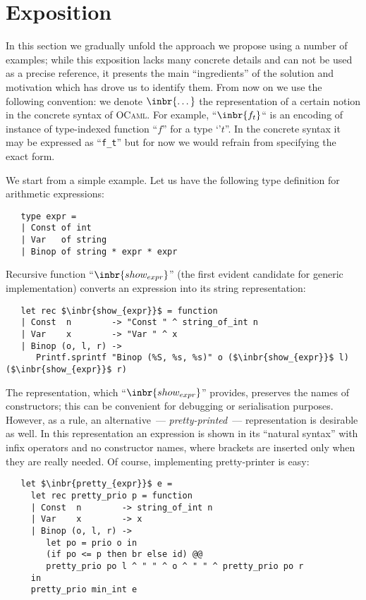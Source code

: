 \section{Exposition}
\label{expo}

In this section we gradually unfold the approach we propose using a number of examples; while this exposition lacks many concrete details and can not be used as a
precise reference, it presents the main ``ingredients'' of the solution and motivation which has drove us to identify them. From now on we use the following
convention: we denote $\inbr{\dots}$ the representation of a certain notion in the concrete syntax of \textsc{OCaml}. For example, ``$\inbr{f_t}$`` is an encoding of instance
of type-indexed function ``$f$'' for a type `'$t$''. In the concrete syntax it may be expressed as ``\lstinline{f_t}'' but for now we would refrain from specifying
the exact form.

We start from a simple example. Let us have the following type definition for arithmetic expressions:

\begin{lstlisting}
   type expr =
   | Const of int
   | Var   of string
   | Binop of string * expr * expr
\end{lstlisting}

Recursive function ``$\inbr{show_{expr}}$'' (the first evident candidate for generic implementation) converts an expression into its string representation: 

\begin{lstlisting}
   let rec $\inbr{show_{expr}}$ = function
   | Const  n        -> "Const " ^ string_of_int n
   | Var    x        -> "Var " ^ x
   | Binop (o, l, r) ->
      Printf.sprintf "Binop (%S, %s, %s)" o ($\inbr{show_{expr}}$ l) ($\inbr{show_{expr}}$ r)
\end{lstlisting}

The representation, which ``$\inbr{show_{expr}}$'' provides, preserves the names of constructors; this can be convenient for debugging or
serialisation purposes. However, as a rule, an alternative~--- \emph{pretty-printed}~--- representation is desirable as well. In this
representation an expression is shown in its ``natural syntax'' with infix operators and no constructor names, where brackets are
inserted only when they are really needed. Of course, implementing pretty-printer is easy:

\begin{lstlisting}
   let $\inbr{pretty_{expr}}$ e =
     let rec pretty_prio p = function
     | Const  n        -> string_of_int n
     | Var    x        -> x
     | Binop (o, l, r) ->
        let po = prio o in
        (if po <= p then br else id) @@
        pretty_prio po l ^ " " ^ o ^ " " ^ pretty_prio po r
     in
     pretty_prio min_int e
\end{lstlisting}

